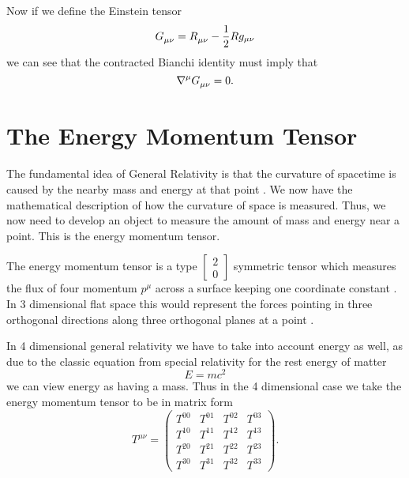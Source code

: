 \noindent Now if we define the Einstein tensor 
\begin{equation} \label{einstein-tensor}
	G\indices{_\mu_\nu} = R\indices{_\mu_\nu} - \frac{1}{2} R g_{\mu \nu}
\end{equation}
we can see that the contracted Bianchi identity must imply that \cite{cheng, carroll}
\begin{equation} \label{etensor0}
	\nabla^{\mu} G\indices{_\mu_\nu} = 0 .
\end{equation}

\section{The Energy Momentum Tensor}

The fundamental idea of General Relativity is that the curvature of spacetime is caused by the nearby mass and energy at that point \cite{hartle, carroll}. We now have the mathematical description of how the curvature of space is measured. Thus, we now need to develop an object to measure the amount of mass and energy near a point. This is the energy momentum tensor.

The energy momentum tensor is a type \( \left[ \begin{smallmatrix} 2 \\ 0 \end{smallmatrix} \right] \) symmetric tensor which measures the flux of four momentum \(p^{\mu}\) across a surface keeping one coordinate constant \cite{carroll}. In 3 dimensional flat space this would represent the forces pointing in three orthogonal directions along three orthogonal planes at a point \cite{cheng}.

In 4 dimensional general relativity we have to take into account energy as well, as due to the classic equation from special relativity for the rest energy of matter
\begin{equation} \label{ifweonlyhadoneequation}
	E = mc^2
\end{equation}
we can view energy as having a mass. Thus in the 4 dimensional case we take the energy momentum tensor to be in matrix form
\begin{equation} \label{e-m-tensor}
	T^{\mu \nu} = 
	\begin{pmatrix} 
		T^{00} & T^{01} & T^{02} & T^{03} \\ 
		T^{10} & T^{11} & T^{12} & T^{13} \\ 
		T^{20} & T^{21} & T^{22} & T^{23} \\ 
		T^{30} & T^{31} & T^{32} & T^{33} 
	\end{pmatrix} .
\end{equation}

